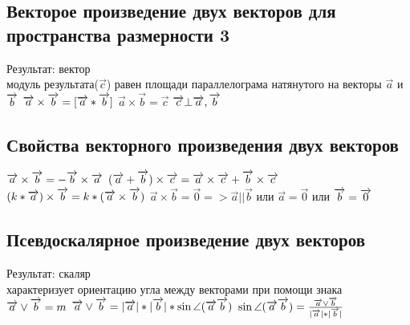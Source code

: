 \documentclass{book}
\begin{document}
\subsection{Векторое произведение двух векторов для пространства размерности 3}
Результат: вектор\\
модуль результата($\overrightarrow{c}$) равен площади параллелограма натянутого на векторы $\overrightarrow{a}$ и $\overrightarrow{b}\\$
$\overrightarrow{a}\times\overrightarrow{b}=[\overrightarrow{a}*\overrightarrow{b}]\\$
$\overrightarrow{a}\times\overrightarrow{b}=\overrightarrow{c}$
$\overrightarrow{c}\bot\overrightarrow{a},\overrightarrow{b}\\$
\subsection{Свойства векторного произведения двух векторов}
$\overrightarrow{a}\times\overrightarrow{b}=-\overrightarrow{b}\times\overrightarrow{a}\\$
$(\overrightarrow{a}+\overrightarrow{b})\times\overrightarrow{c}=\overrightarrow{a}\times\overrightarrow{c}+\overrightarrow{b}\times\overrightarrow{c}\\$
$(k*\overrightarrow{a})\times\overrightarrow{b}=k*(\overrightarrow{a}\times\overrightarrow{b})\\$
$\overrightarrow{a}\times\overrightarrow{b}=\overrightarrow{0} => \overrightarrow{a}||\overrightarrow{b}$ или $\overrightarrow{a}=\overrightarrow{0}$ или $\overrightarrow{b}=\overrightarrow{0}\\$

\subsection{Псевдоскалярное произведение двух векторов}
Результат: скаляр\\
характеризует ориентацию угла между векторами при помощи знака\\
$\overrightarrow{a}\vee\overrightarrow{b}=m\\$
$\overrightarrow{a}\vee\overrightarrow{b}=|\overrightarrow{a}|*|\overrightarrow{b}|*\sin\angle(\overrightarrow{a}\overrightarrow{b})\\$
$\sin\angle(\overrightarrow{a}\overrightarrow{b})=\frac{\overrightarrow{a}\vee\overrightarrow{b}}{|\overrightarrow{a}|*|\overrightarrow{b}|}\\$
\end{document}
